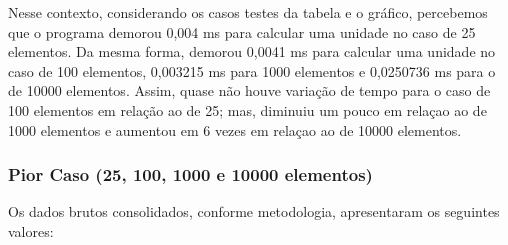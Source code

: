 \documentclass[a4paper, 12pt]{article}
\begin{document}
Nesse contexto, considerando os casos testes da tabela e o gráfico, percebemos que o programa demorou 0,004 ms para calcular uma unidade no caso de 25 elementos. Da mesma forma, demorou 0,0041 ms para calcular uma unidade no caso de 100 elementos, 0,003215 ms para 1000 elementos e 0,0250736 ms para o de 10000 elementos. Assim, quase não houve variação de tempo para o caso de 100 elementos em relação ao de 25; mas, diminuiu um pouco em relaçao ao de 1000 elementos e aumentou em 6 vezes em relaçao ao de 10000 elementos.


\subsubsection{Pior Caso (25, 100, 1000 e 10000 elementos)}

\tab{ }Os dados brutos consolidados, conforme metodologia, apresentaram os seguintes valores:
\vspace{0.2cm}
\end{document}
